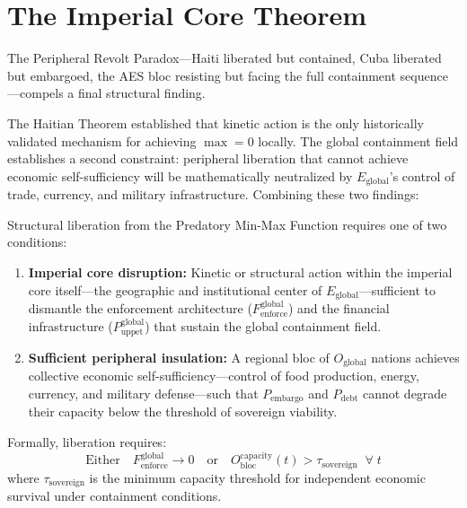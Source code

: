 \section{The Imperial Core Theorem}
\label{sec:imperial_core_theorem}

The Peripheral Revolt Paradox---Haiti liberated but contained, Cuba liberated but embargoed, the AES bloc resisting but facing the full containment sequence---compels a final structural finding.

The Haitian Theorem established that kinetic action is the only historically validated mechanism for achieving $\max = 0$ locally. The global containment field establishes a second constraint: peripheral liberation that cannot achieve economic self-sufficiency will be mathematically neutralized by $E_{\text{global}}$'s control of trade, currency, and military infrastructure. Combining these two findings:

\begin{definition}
Structural liberation from the Predatory Min-Max Function requires one of two conditions:
\begin{enumerate}
    \item \textbf{Imperial core disruption:} Kinetic or structural action within the imperial core itself---the geographic and institutional center of $E_{\text{global}}$---sufficient to dismantle the enforcement architecture ($F_{\text{enforce}}^{\text{global}}$) and the financial infrastructure ($P_{\text{uppet}}^{\text{global}}$) that sustain the global containment field.
    \item \textbf{Sufficient peripheral insulation:} A regional bloc of $O_{\text{global}}$ nations achieves collective economic self-sufficiency---control of food production, energy, currency, and military defense---such that $P_{\text{embargo}}$ and $P_{\text{debt}}$ cannot degrade their capacity below the threshold of sovereign viability.
\end{enumerate}
Formally, liberation requires:
\begin{equation}\label{eq:13.14-imperial-core-collapse}
\text{Either} \quad F_{\text{enforce}}^{\text{global}} \rightarrow 0 \quad \text{or} \quad O_{\text{bloc}}^{\text{capacity}}(t) > \tau_{\text{sovereign}} \;\;\forall\; t
\end{equation}
where $\tau_{\text{sovereign}}$ is the minimum capacity threshold for independent economic survival under containment conditions.
\end{definition}

